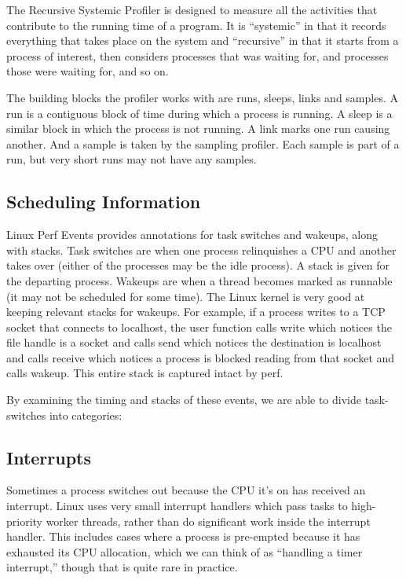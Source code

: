\documentclass[10pt]{article}
\begin{document}
The Recursive Systemic Profiler is designed to measure all the activities that contribute to the running time of a program.  It is ``systemic'' in that it records everything that takes place on the system and ``recursive'' in that it starts from a process of interest, then considers processes that was waiting for, and processes those were waiting for, and so on.

The building blocks the profiler works with are runs, sleeps, links and samples.  A run is a contiguous block of time during which a process is running.  A sleep is a similar block in which the process is not running.  A link marks one run causing another.  And a sample is taken by the sampling profiler.  Each sample is part of a run, but very short runs may not have any samples.

\subsection{Scheduling Information}

Linux Perf Events provides annotations for task switches and wakeups, along with stacks.  Task switches are when one process relinquishes a CPU and another takes over (either of the processes may be the idle process).  A stack is given for the departing process.  Wakeups are when a thread becomes marked as runnable (it may not be scheduled for some time).  The Linux kernel is very good at keeping relevant stacks for wakeups.  For example, if a process writes to a TCP socket that connects to localhost, the user function calls write which notices the file handle is a socket and calls send which notices the destination is localhost and calls receive which notices a process is blocked reading from that socket and calls wakeup.  This entire stack is captured intact by perf.

By examining the timing and stacks of these events, we are able to divide task-switches into categories:

\subsection{Interrupts}

Sometimes a process switches out because the CPU it's on has received an interrupt.  Linux uses very small interrupt handlers which pass tasks to high-priority worker threads, rather than do significant work inside the interrupt handler.  This includes cases where a process is pre-empted because it has exhausted its CPU allocation, which we can think of as ``handling a timer interrupt,'' though that is quite rare in practice.
\end{document}
